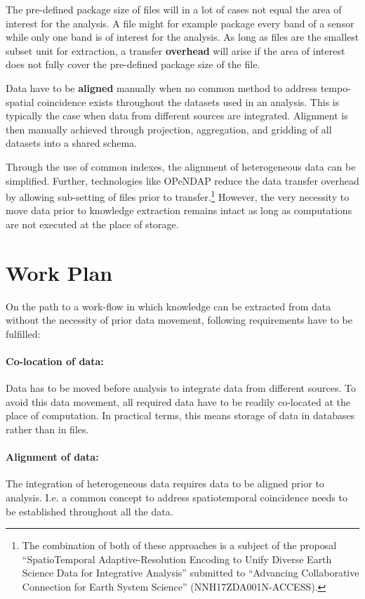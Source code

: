 \documentclass[a4paper,10pt]{article}
\begin{document}
The pre-defined package size of files will in a lot of cases not equal the area of
interest for the analysis. A file might for example package every band of a
sensor while only one band is of interest for the analysis. As long as files are the smallest subset unit for extraction, a transfer \textbf{overhead} will arise if  
the area of interest does not fully cover the pre-defined package size of the file.

Data have to be \textbf{aligned} manually when no common method to address tempo-spatial coincidence exists throughout the datasets used in an analysis. This is typically 
the case when data from different sources are integrated. Alignment is then manually achieved through projection, aggregation, and gridding of all datasets into a shared schema.

Through the use of common indexes, the alignment of heterogeneous data can be simplified.
Further, technologies like \gls{OPeNDAP} reduce the data transfer overhead by allowing
sub-setting of files prior to transfer.\footnote{The combination of both of these approaches is a subject of the proposal ``SpatioTemporal Adaptive-Resolution Encoding to Unify Diverse Earth Science Data for Integrative Analysis'' submitted to ``Advancing Collaborative Connection for Earth System Science'' (NNH17ZDA001N-ACCESS).}
However, the very necessity to move data prior to knowledge extraction remains intact
as long as computations are not executed at the place of storage.

\newpage

\section{Work Plan}
On the path to a work-flow in which knowledge can be extracted from data without the necessity of prior data movement, following requirements have to be fulfilled:

\paragraph{Co-location of data:}
Data has to be moved before analysis to integrate data from different sources. 
To avoid this data movement, all required data have to be readily co-located at the place of computation. In practical terms, this means storage of data in databases
rather than in files.

\paragraph{Alignment of data:}
The integration of heterogeneous data requires data to be aligned prior to analysis. I.e. a common concept to address spatiotemporal coincidence needs to be established throughout all the data.
\end{document}
